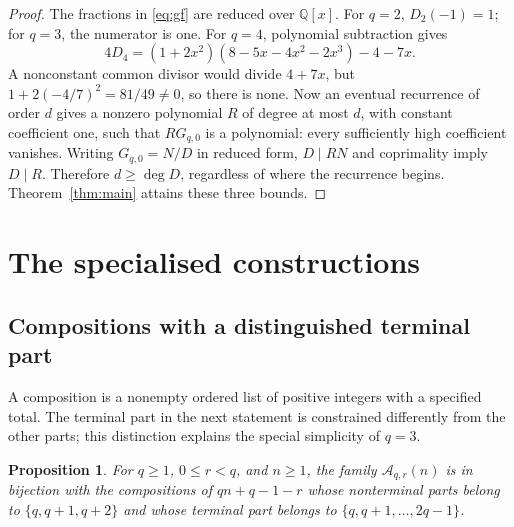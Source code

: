 \documentclass[11pt,a4paper]{article}
\newtheorem{proposition}[theorem]{Proposition}
\theoremstyle{remark}
\newcommand{\A}{\mathcal A}
\newcommand{\Q}{\mathbb Q}
\begin{document}
\begin{proof}
The fractions in \eqref{eq:gf} are reduced over $\Q[x]$. For $q=2$,
$D_2(-1)=1$; for $q=3$, the numerator is one. For $q=4$, polynomial
subtraction gives
\[
 4D_4=(1+2x^2)(8-5x-4x^2-2x^3)-4-7x.
\]
A nonconstant common divisor would divide $4+7x$, but
$1+2(-4/7)^2=81/49\ne0$, so there is none.
Now an eventual recurrence of order $d$ gives a nonzero polynomial $R$
of degree at most $d$, with constant coefficient one, such that
$RG_{q,0}$ is a polynomial: every sufficiently high coefficient vanishes.
Writing $G_{q,0}=N/D$ in reduced form, $D\mid RN$ and coprimality imply
$D\mid R$. Therefore $d\ge\deg D$, regardless of where the recurrence
begins. Theorem~\ref{thm:main} attains these three bounds.
\end{proof}

\section{The specialised constructions}

\subsection{Compositions with a distinguished terminal part}

A composition is a nonempty ordered list of positive integers with a
specified total. The terminal part in the next statement is constrained
differently from the other parts; this distinction explains the special
simplicity of $q=3$.

\begin{proposition}\label{prop:terminal}
For $q\ge1$, $0\le r<q$, and $n\ge1$, the family $\A_{q,r}(n)$ is in
bijection with the compositions of $qn+q-1-r$ whose nonterminal parts
belong to $\{q,q+1,q+2\}$ and whose terminal part belongs to
$\{q,q+1,\ldots,2q-1\}$.
\end{proposition}
\end{document}
